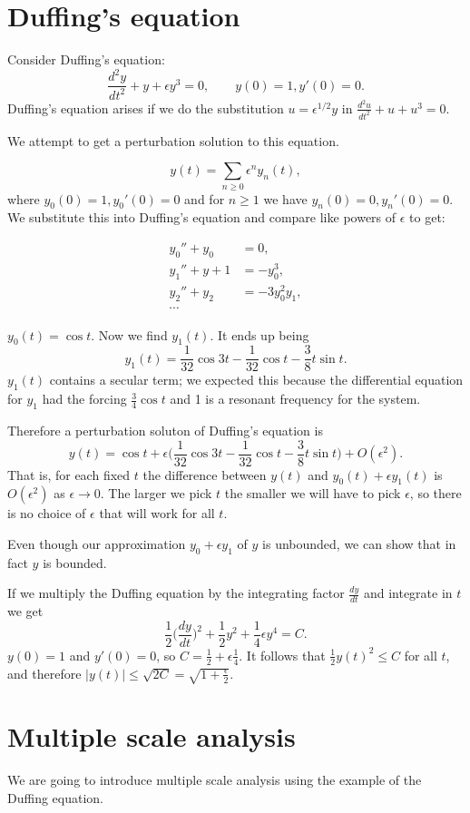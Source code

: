 \documentclass[11pt]{article}
\begin{document}
\section{Duffing's equation}
Consider Duffing's equation:
\[
\frac{d^2 y}{dt^2}+y+\epsilon y^3=0, \qquad y(0)=1, y'(0)=0.
\]
Duffing's equation arises if we do the substitution $u=\epsilon^{1/2} y$ in $\frac{d^2 u}{dt^2}+u+u^3=0$.

We attempt to get a perturbation solution to this equation.

\[
y(t)=\sum_{n \geq 0} \epsilon^n y_n(t),
\]
where $y_0(0)=1, y_0'(0)=0$ and for $n \geq 1$ we have $y_n(0)=0, y_n'(0)=0$. We substitute this into Duffing's equation and compare like powers of $\epsilon$ to get:

\begin{align*}
y_0''+y_0&=0,\\
y_1''+y+1&=-y_0^3,\\
y_2''+y_2&=-3y_0^2y_1,\\
\cdots&
\end{align*}

$y_0(t)=\cos t$. Now we find $y_1(t)$. It ends up being
\[
y_1(t)=\frac{1}{32}\cos 3t -\frac{1}{32}\cos t -\frac{3}{8}t\sin t.
\]
$y_1(t)$ contains a secular term; we expected this because the differential equation for $y_1$ had the forcing $\frac{3}{4}\cos t$ and 1 is a resonant frequency for the system.

Therefore a perturbation soluton of Duffing's equation is 
\[
y(t)=\cos t+\epsilon\Big( \frac{1}{32}\cos 3t -\frac{1}{32}\cos t -\frac{3}{8}t\sin t \Big) +O(\epsilon^2).
\]
That is, for each fixed $t$ the difference between $y(t)$ and $y_0(t)+\epsilon y_1(t)$ is $O(\epsilon ^2)$ as $\epsilon \to 0$. The larger we pick $t$ the smaller we will have to pick $\epsilon$, so there is no choice of $\epsilon$ that will work for all $t$.

Even though our approximation $y_0+\epsilon y_1$ of $y$ is unbounded, we can show that in fact $y$ is bounded.

If we multiply the Duffing equation by the integrating factor $\frac{dy}{dt}$ and integrate in $t$ we get
\[
\frac{1}{2} \Big( \frac{dy}{dt}\Big)^2 +\frac{1}{2}y^2+\frac{1}{4}\epsilon y^4=C.
\]
$y(0)=1$ and $y'(0)=0$, so $C=\frac{1}{2}+\epsilon \frac{1}{4}$. It follows that $\frac{1}{2}y(t)^2 \leq C$ for all $t$, and therefore $|y(t)| \leq \sqrt{2C}=\sqrt{1+\frac{\epsilon}{2}}$.

\section{Multiple scale analysis}
We are going to introduce multiple scale analysis using the example of the Duffing equation.
\end{document}
